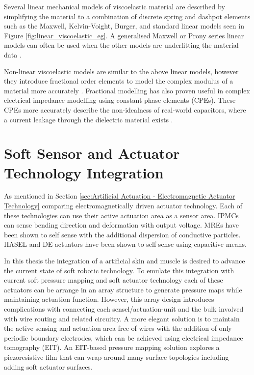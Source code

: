Several linear mechanical models of viscoelastic material are described by simplifying the material to a combination of discrete spring and dashpot elements such as the Maxwell, Kelvin-Voight, Burger, and standard linear models seen in Figure \ref{fig:linear_viscoelastic_eg}. A generalised Maxwell or Prony series linear models can often be used when the other models are underfitting the material data \cite{Babaei2015,Tzikang2000}. 

Non-linear viscoelastic models are similar to the above linear models, however they introduce fractional order elements to model the complex modulus of a material more accurately \cite{Bonfanti2020}. Fractional modelling has also proven useful in complex electrical impedance modelling using constant phase elements (CPEs). These CPEs more accurately describe the non-idealness of real-world capacitors, where a current leakage through the dielectric material exists \cite{Vosika2013, Chang2022}.


\section{Soft Sensor and Actuator Technology Integration}


As mentioned in Section \ref{sec:Artificial Actuation - Electromagnetic Actuator Technology} comparing electromagnetically driven actuator technology. Each of these technologies can use their active actuation area as a sensor area. IPMCs can sense bending direction and deformation with output voltage. MREs have been shown to self sense with the additional dispersion of conductive particles. HASEL and DE actuators have been shown to self sense using capacitive means. 

In this thesis the integration of a artificial skin and muscle is desired to advance the current state of soft robotic technology. To emulate this integration with current soft pressure mapping and soft actuator technology each of these actuators can be arrange in an array structure to generate pressure maps while maintaining actuation function. However, this array design introduces complications with connecting each sensel/actuation-unit and the bulk involved with wire routing and related circuitry. A more elegant solution is to maintain the active sensing and actuation area free of wires with the addition of only periodic boundary electrodes, which can be achieved using electrical impedance tomography (EIT). An EIT-based pressure mapping solution explores a piezoresistive film that can wrap around many surface topologies including adding soft actuator surfaces.

